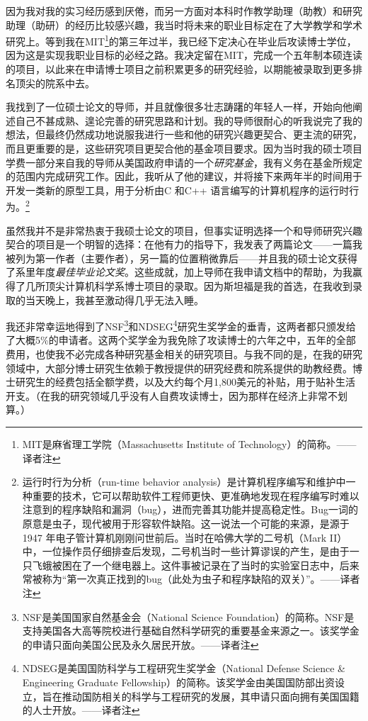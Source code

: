 \documentclass[12pt,UTF8,nofonts]{book}
\begin{document}
因为我对我的实习经历感到厌倦，而另一方面对本科时作教学助理（助教）和研究助理（助研）的经历比较感兴趣，我当时将未来的职业目标定在了大学教学和学术研究上。等到我在MIT\footnote{MIT是麻省理工学院（Massachusetts Institute of Technology）的简称。——译者注}的第三年过半，我已经下定决心在毕业后攻读博士学位，因为这是实现我职业目标的必经之路。我决定留在MIT，完成一个五年制本硕连读的项目，以此来在申请博士项目之前积累更多的研究经验，以期能被录取到更多排名顶尖的院系中去。

我找到了一位硕士论文的导师，并且就像很多壮志踌躇的年轻人一样，开始向他阐述自己不甚成熟、遑论完善的研究思路和计划。我的导师很耐心的听我说完了我的想法，但最终仍然成功地说服我进行一些和他的研究兴趣更契合、更主流的研究，而且更重要的是，这些研究项目更契合他的基金项目要求。因为当时我的硕士项目学费一部分来自我的导师从美国政府申请的一个\emph{研究基金}，我有义务在基金所规定的范围内完成研究工作。因此，我听从了他的建议，并将接下来两年半的时间用于开发一类新的原型工具，用于分析由C 和C++ 语言编写的计算机程序的运行时行为。\footnote{运行时行为分析（run-time behavior analysis）是计算机程序编写和维护中一种重要的技术，它可以帮助软件工程师更快、更准确地发现在程序编写时难以注意到的程序缺陷和漏洞（bug），进而完善其功能并提高稳定性。Bug一词的原意是虫子，现代被用于形容软件缺陷。这一说法一个可能的来源，是源于1947 年电子管计算机刚刚问世前后。当时在哈佛大学的二号机（Mark II）中，一位操作员仔细排查后发现，二号机当时一些计算谬误的产生，是由于一只飞蛾被困在了一个继电器上。这件事被记录在了当时的实验室日志中，后来常被称为“第一次真正找到的bug（此处为虫子和程序缺陷的双关）”。——译者注}

虽然我并不是非常热衷于我硕士论文的项目，但事实证明选择一个和导师研究兴趣契合的项目是一个明智的选择：在他有力的指导下，我发表了两篇论文——一篇我被列为第一作者（主要作者），另一篇的位置稍微靠后——并且我的硕士论文获得了系里年度\emph{最佳毕业论文奖}。这些成就，加上导师在我申请文档中的帮助，为我赢得了几所顶尖计算机科学系博士项目的录取。因为斯坦福是我的首选，在我收到录取的当天晚上，我甚至激动得几乎无法入睡。

我还非常幸运地得到了NSF\footnote{NSF是美国国家自然基金会（National Science Foundation）的简称。NSF是支持美国各大高等院校进行基础自然科学研究的重要基金来源之一。该奖学金的申请只面向美国公民及永久居民开放。——译者注}和NDSEG\footnote{NDSEG是美国国防科学与工程研究生奖学金（National Defense Science \& Engineering  Graduate Fellowship）的简称。该奖学金由美国国防部出资设立，旨在推动国防相关的科学与工程研究的发展，其申请只面向拥有美国国籍的人士开放。——译者注}研究生奖学金的垂青，这两者都只颁发给了大概5\%的申请者。这两个奖学金为我免除了攻读博士的六年之中，五年的全部费用，也使我不必完成各种研究基金相关的研究项目。与我不同的是，在我的研究领域中，大部分博士研究生依赖于教授提供的研究经费和院系提供的助教经费。博士研究生的经费包括全额学费，以及大约每个月1,800美元的补贴，用于贴补生活开支。（在我的研究领域几乎没有人自费攻读博士，因为那样在经济上非常不划算。）
\end{document}
